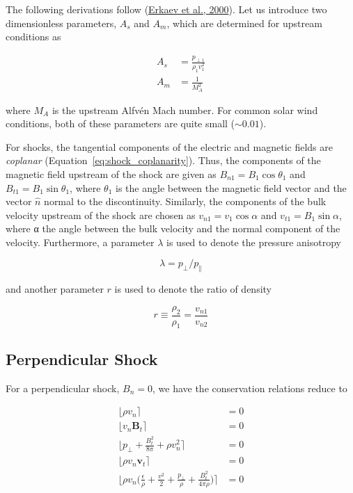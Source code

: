 \documentclass[
  notoc %
]{tufte-book}
\begin{document}
The following derivations follow
(\protect\hyperlink{ref-erkaev2000solution}{Erkaev et al., 2000}). Let
us introduce two dimensionless parameters, \(A_s\) and \(A_m\), which
are determined for upstream conditions as

\[
\begin{aligned}
A_s &= \frac{p_{\perp 1}}{\rho_1 v_1^2} \\
A_m &= \frac{1}{M_A^2}
\end{aligned}
\]

where \(M_A\) is the upstream Alfvén Mach number. For common solar wind
conditions, both of these parameters are quite small (\(\sim 0.01\)).

For shocks, the tangential components of the electric and magnetic
fields are \emph{coplanar} (Equation~\ref{eq:shock_coplanarity}). Thus,
the components of the magnetic field upstream of the shock are given as
\(B_{n1} = B_1 \cos\theta_1\) and \(B_{t1} = B_1 \sin\theta_1\), where
\(\theta_1\) is the angle between the magnetic field vector and the
vector \(\hat{n}\) normal to the discontinuity. Similarly, the
components of the bulk velocity upstream of the shock are chosen as
\(v_{n1} = v_1 \cos\alpha\) and \(v_{t1} = B_1 \sin\alpha\), where α the
angle between the bulk velocity and the normal component of the
velocity. Furthermore, a parameter \(\lambda\) is used to denote the
pressure anisotropy

\[
\lambda = p_\perp / p_\parallel
\]

and another parameter \(r\) is used to denote the ratio of density

\[
r \equiv \frac{\rho_2}{\rho_1} = \frac{v_{n1}}{v_{n2}}
\]

\hypertarget{perpendicular-shock}{%
\subsection{Perpendicular Shock}\label{perpendicular-shock}}

For a perpendicular shock, \(B_n = 0\), we have the conservation
relations reduce to

\[
\begin{aligned}
\lfloor \rho v_n \rceil &= 0 \\
\lfloor v_n\mathbf{B}_t \rceil &= 0 \\
\lfloor p_\perp + \frac{B_t^2}{8\pi} + \rho v_n^2 \rceil &= 0 \\
\lfloor \rho v_n \mathbf{v}_t \rceil &= 0 \\
\lfloor \rho v_n\big( \frac{\epsilon}{\rho} + \frac{v^2}{2} + \frac{p_\perp}{\rho} + \frac{B_t^2}{4\pi \rho} \big) \rceil &= 0
\end{aligned}
\]
\end{document}
